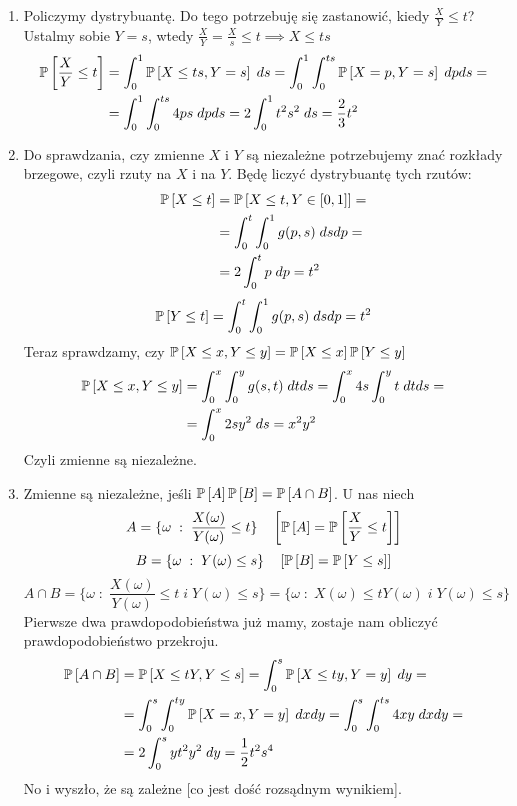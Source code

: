 \documentclass{article}
\begin{document}
\begin{enumerate}[label=(\alph*), leftmargin=*]
   \item Policzymy dystrybuantę. Do tego potrzebuję się zastanowić, kiedy $\frac{X}{Y}\leq t$? Ustalmy sobie $Y=s$, wtedy $\frac{X}{Y}=\frac{X}{s}\leq t\implies X\leq ts$
   \begin{align*}
        \prob{\frac{X}{Y}\leq t}&=\int_0^1\prob{X\leq ts, Y=s}\;ds=\int_0^1\int_0^{ts}\prob{X=p, Y=s}\;dpds=\\
        &=\int_0^1\int_0^{ts}4ps\;dpds=2\int_0^1t^2s^2\;ds=\frac{2}{3}t^2
   \end{align*}
   \item Do sprawdzania, czy zmienne $X$ i $Y$ są niezależne potrzebujemy znać rozkłady brzegowe, czyli rzuty na $X$ i na $Y$. Będę liczyć dystrybuantę tych rzutów:
   \begin{align*}
        \prob{X\leq t}&=\prob{X\leq t, Y\in[0,1]}=\\
        &=\int_0^t\int_0^1g(p, s)\;dsdp=\\
        &=2\int_0^tp\;dp=t^2
    \end{align*}
   $$\prob{Y\leq t}=\int_0^t\int_0^1g(p, s)\;dsdp=t^2$$
   Teraz sprawdzamy, czy $\prob{X\leq x, Y\leq y}=\prob{X\leq x}\prob{Y\leq y}$
   \begin{align*}
        \prob{X\leq x, Y\leq y}&=\int_0^x\int_0^yg(s, t)\;dtds=\int_0^x4s\int_0^yt\;dtds=\\
        &=\int_0^x2sy^2\;ds=x^2y^2
   \end{align*}
   Czyli zmienne są niezależne.
   \item Zmienne są niezależne, jeśli $\prob{A}\prob{B}=\prob{A\cap B}$. U nas niech
   $$A=\{\omega\;:\;\frac{X(\omega)}{Y(\omega)}\leq t\}\quad\left[\prob{A}=\prob{\frac{X}{Y}\leq t}\right]$$
   $$B=\{\omega\;:\;Y(\omega)\leq s\}\quad\left[\prob{B}=\prob{Y\leq s}\right]$$
   $$A\cap B=\{\omega\;:\;\frac{X(\omega)}{Y(\omega)}\leq t\;i\;Y(\omega)\leq s\}=\{\omega\;:\;X(\omega)\leq tY(\omega)\;i\;Y(\omega)\leq s\}$$
   Pierwsze dwa prawdopodobieństwa już mamy, zostaje nam obliczyć prawdopodobieństwo przekroju.
   \begin{align*}
        \prob{A\cap B}&=\prob{X\leq tY, Y\leq s}=\int_0^s\prob{X\leq ty, Y=y}\;dy=\\
        &=\int_0^s\int_0^{ty}\prob{X=x, Y=y}\;dxdy=\int_0^s\int_0^{ts}4xy\;dxdy=\\
        &=2\int_0^syt^2y^2\;dy=\frac{1}{2}t^2{s^4}
   \end{align*}
   No i wyszło, że są zależne [co jest dość rozsądnym wynikiem].
\end{enumerate}
\end{document}

